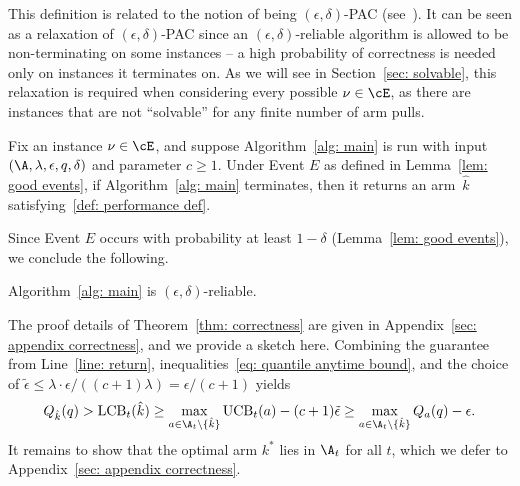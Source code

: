 \begin{remark}
    \label{rem: PAC}
    This definition is related to the notion of being $(\epsilon, \delta)$-PAC (see~\cite{EvenDar2002PACBF}). It can be seen as a relaxation of $(\epsilon, \delta)$-PAC since an $(\epsilon, \delta)$-reliable algorithm is allowed to be non-terminating on some instances -- a high probability of correctness is needed only on instances it terminates on.
    As we will see in Section~\ref{sec: solvable}, this relaxation is required when considering every possible $\nu \in \cE$,
    as there are instances that are not ``solvable'' for any finite number of arm pulls.
\end{remark}


\begin{theorem}
\label{thm: correctness}
    Fix an instance $\nu \in \cE$, and suppose Algorithm~\ref{alg: main} is run with input $(\A, \lambda, \epsilon, q, \delta)$ and parameter $c \ge 1$.
    Under Event $E$ as defined in Lemma~\ref{lem: good events}, if Algorithm~\ref{alg: main} terminates, then
    it returns an arm~$\hat{k}$ satisfying~\eqref{def: performance def}.
\end{theorem}
Since Event $E$ occurs with probability at least $1-\delta$ (Lemma~\ref{lem: good events}), we conclude the following.
\begin{corollary}
\label{cor: main alg reliable}
    Algorithm~\ref{alg: main} is $(\epsilon, \delta)$-reliable.
\end{corollary}

The proof details of Theorem~\ref{thm: correctness} are given in Appendix~\ref{sec: appendix correctness}, and we provide a sketch here.
    Combining the guarantee from Line~\ref{line: return}, inequalities~\eqref{eq: quantile anytime bound}, and the choice of $\tilde{\epsilon} \le \lambda \cdot \epsilon/((c+1) \lambda) = \epsilon/(c+1)$ yields
    \begin{equation}
    Q_{\hat{k}}(q) >
    \mathrm{LCB}_t(\hat{k})  \ge
    \max\limits_{a \in \A_t \setminus \{ \hat{k} \} }  
    \mathrm{UCB}_t(a) -  (c+1)\tilde{\epsilon}    
    \ge 
    \max\limits_{a \in \A_t \setminus \{ \hat{k} \} }
    Q_a(q) -  \epsilon.  
    \end{equation}
    It remains to show that the optimal arm $k^*$ lies in $\A_t$ for all $t$, which we defer to Appendix~\ref{sec: appendix correctness}.



